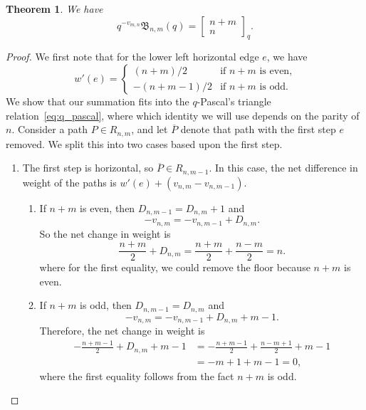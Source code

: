 \documentclass[11pt, leqno]{amsart}
\theoremstyle{plain}
\newtheorem{theorem}{Theorem}[section]
\theoremstyle{definition}
\numberwithin{equation}{section}
\newcommand{\qbinom}[3]{\left[ \begin{matrix} #1 \\ #2 \end{matrix} \right]_{#3}} %
\newcommand{\B}{\mathfrak{B}}
\begin{document}

\begin{theorem}
\label{thm:q_binomial_paths}
We have
\[
q^{-v_{m,n}} \B_{n,m}(q) = \qbinom{n+m}{n}{q}.
\]
\end{theorem}

\begin{proof}
We first note that for the lower left horizontal edge $e$, we have
\[
w'(e) = \begin{cases}
(n+m)/2 & \text{if $n+m$ is even,} \\
-(n+m-1)/2 & \text{if $n+m$ is odd.}
\end{cases}
\]
We show that our summation fits into the $q$-Pascal's triangle relation~\ref{eq:q_pascal}, where which identity we will use depends on the parity of $n$.
Consider a path $P \in R_{n,m}$, and let $\overline{P}$ denote that path with the first step $e$ removed. We split this into two cases based upon the first step.
\begin{enumerate}
\item The first step is horizontal, so $\overline{P} \in R_{n,m-1}$. In this case, the net difference in weight of the paths is $w'(e) + (v_{n,m} - v_{n,m-1})$.
\begin{enumerate}
\item If $n + m$ is even, then $D_{n,m-1} = D_{n,m} + 1$ and
\[
-v_{n,m} = -v_{n,m-1} + D_{n,m}.
\]
So the net change in weight is
\[
\frac{n+m}{2} + D_{n,m} = \frac{n+m}{2} + \frac{n - m}{2} = n.
\]
where for the first equality, we could remove the floor because $n + m$ is even.
\item If $n + m$ is odd, then $D_{n,m-1} = D_{n,m}$ and
\[
-v_{n,m} = -v_{n,m-1} + D_{n,m} + m - 1.
\]
Therefore, the net change in weight is
\begin{align*}
-\frac{n + m - 1}{2} + D_{n,m} + m - 1 & =  -\frac{n + m - 1}{2} + \frac{n - m + 1}{2} + m - 1
\\ & = -m + 1 + m - 1 = 0,
\end{align*}
where the first equality follows from the fact $n + m$ is odd.
\end{enumerate}


\end{enumerate}
\end{proof}
\end{document}
